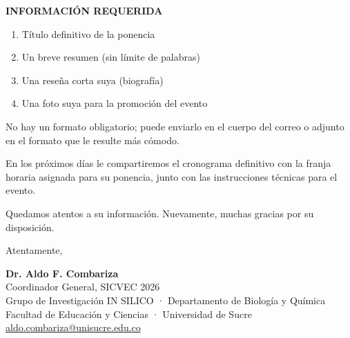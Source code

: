 \documentclass[11pt,a4paper]{article}
\begin{document}
\noindent
\textbf{INFORMACIÓN REQUERIDA}

\begin{enumerate}
  \item Título definitivo de la ponencia
  \item Un breve resumen (sin límite de palabras)
  \item Una reseña corta suya (biografía)
  \item Una foto suya para la promoción del evento
\end{enumerate}

No hay un formato obligatorio; puede enviarlo en el cuerpo del correo o adjunto en el formato que le resulte más cómodo.

\vspace{0.1cm}

En los próximos días le compartiremos el cronograma definitivo con la franja horaria asignada para su ponencia, junto con las instrucciones técnicas para el evento.

\vspace{0.1cm}

Quedamos atentos a su información. Nuevamente, muchas gracias por su disposición.

\vspace{0.15cm}

Atentamente,

\vspace{0.15cm}

\textbf{Dr. Aldo F. Combariza}\\
Coordinador General, SICVEC 2026\\
Grupo de Investigación IN SILICO · Departamento de Biología y Química\\
Facultad de Educación y Ciencias · Universidad de Sucre\\
\href{mailto:aldo.combariza@unisucre.edu.co}{aldo.combariza@unisucre.edu.co}

\vspace{0.2cm}
\end{document}
